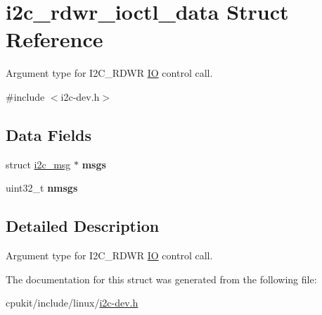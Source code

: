 \hypertarget{structi2c__rdwr__ioctl__data}{}\section{i2c\+\_\+rdwr\+\_\+ioctl\+\_\+data Struct Reference}
\label{structi2c__rdwr__ioctl__data}


Argument type for I2\+C\+\_\+\+R\+D\+WR \mbox{\hyperlink{structIO}{IO}} control call.  




{\ttfamily \#include $<$i2c-\/dev.\+h$>$}

\subsection*{Data Fields}
\begin{DoxyCompactItemize}
\item 
\mbox{\label{structi2c__rdwr__ioctl__data_a436bb0f35544ff79b2c0ac3570f5b7f0}} 
struct \mbox{\hyperlink{structi2c__msg}{i2c\+\_\+msg}} $\ast$ {\bfseries msgs}
\item 
\mbox{\label{structi2c__rdwr__ioctl__data_a9b0bab25c7411f05116fdc3ee0679cd8}} 
uint32\+\_\+t {\bfseries nmsgs}
\end{DoxyCompactItemize}


\subsection{Detailed Description}
Argument type for I2\+C\+\_\+\+R\+D\+WR \mbox{\hyperlink{structIO}{IO}} control call. 

The documentation for this struct was generated from the following file\+:\begin{DoxyCompactItemize}
\item 
cpukit/include/linux/\mbox{\hyperlink{i2c-dev_8h}{i2c-\/dev.\+h}}\end{DoxyCompactItemize}
